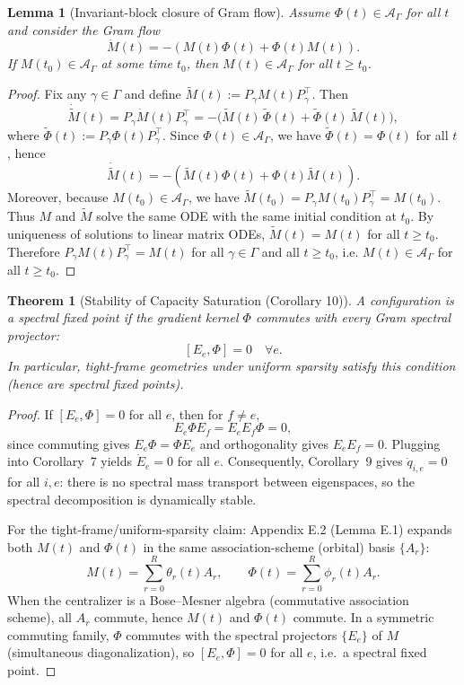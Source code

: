 \documentclass{article}
\theoremstyle{plain}
\newtheorem{theorem}{Theorem}
\newtheorem{lemma}{Lemma}[section]
\numberwithin{equation}{section}
\theoremstyle{definition}
\theoremstyle{remark}
\begin{document}
\begin{lemmaproofbox}
\begin{lemma}[Invariant-block closure of Gram flow]\label{corollary:stability}
Assume $\Phi(t)\in\mathcal{A}_\Gamma$ for all $t$ and consider the Gram flow
\[
\dot M(t)=-(M(t)\Phi(t)+\Phi(t)M(t)).
\]
If $M(t_0)\in\mathcal{A}_\Gamma$ at some time $t_0$, then $M(t)\in\mathcal{A}_\Gamma$ for all $t\ge t_0$.
\end{lemma}
\begin{proof}
Fix any $\gamma\in\Gamma$ and define $\widetilde M(t):=P_\gamma M(t)P_\gamma^\top$.
Then
\[
\dot{\widetilde M}(t)
= P_\gamma \dot M(t)P_\gamma^\top
= -\big(\widetilde M(t)\,\widetilde\Phi(t)+\widetilde\Phi(t)\,\widetilde M(t)\big),
\]
where $\widetilde\Phi(t):=P_\gamma \Phi(t)P_\gamma^\top$.
Since $\Phi(t)\in\mathcal{A}_\Gamma$, we have $\widetilde\Phi(t)=\Phi(t)$ for all $t$, hence
\[
\dot{\widetilde M}(t)=-(\widetilde M(t)\Phi(t)+\Phi(t)\widetilde M(t)).
\]
Moreover, because $M(t_0)\in\mathcal{A}_\Gamma$, we have
$\widetilde M(t_0)=P_\gamma M(t_0)P_\gamma^\top=M(t_0)$.
Thus $M$ and $\widetilde M$ solve the same ODE with the same initial condition at $t_0$.
By uniqueness of solutions to linear matrix ODEs, $\widetilde M(t)=M(t)$ for all $t\ge t_0$.
Therefore $P_\gamma M(t)P_\gamma^\top=M(t)$ for all $\gamma\in\Gamma$ and all $t\ge t_0$, i.e.
$M(t)\in\mathcal{A}_\Gamma$ for all $t\ge t_0$.
\end{proof}
\end{lemmaproofbox}
\begin{lemmaproofbox}
\begin{theorem}[Stability of Capacity Saturation (Corollary 10)]
A configuration is a spectral fixed point if the gradient kernel $\Phi$ commutes with every Gram spectral projector:
\[
[E_e,\Phi]=0\quad \forall e.
\]
In particular, tight-frame geometries under uniform sparsity satisfy this condition (hence are spectral fixed points).
\end{theorem}
\begin{proof}
If $[E_e,\Phi]=0$ for all $e$, then for $f\neq e$,
\[
E_e\Phi E_f = E_eE_f\Phi = 0,
\]
since commuting gives $E_e\Phi=\Phi E_e$ and orthogonality gives $E_eE_f=0$.
Plugging into Corollary~7 yields $\dot E_e=0$ for all $e$. Consequently, Corollary~9 gives $\dot q_{i,e}=0$ for all $i,e$:
there is no spectral mass transport between eigenspaces, so the spectral decomposition is dynamically stable.

For the tight-frame/uniform-sparsity claim: Appendix E.2 (Lemma E.1) expands both $M(t)$ and $\Phi(t)$ in the same
association-scheme (orbital) basis $\{A_r\}$:
\[
M(t)=\sum_{r=0}^R \theta_r(t)A_r,\qquad \Phi(t)=\sum_{r=0}^R \phi_r(t)A_r.
\]
When the centralizer is a Bose--Mesner algebra (commutative association scheme), all $A_r$ commute, hence $M(t)$ and $\Phi(t)$ commute.
In a symmetric commuting family, $\Phi$ commutes with the spectral projectors $\{E_e\}$ of $M$ (simultaneous diagonalization),
so $[E_e,\Phi]=0$ for all $e$, i.e.\ a spectral fixed point.
\end{proof}
\end{lemmaproofbox}
\end{document}
